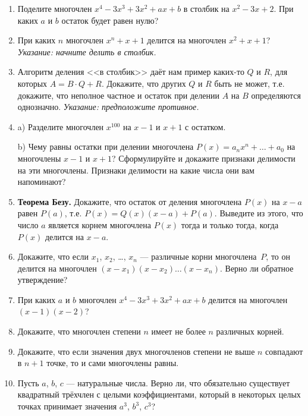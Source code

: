 \documentclass{article}
\begin{document}
\begin{enumerate}[label*=\protect\fbox{\arabic{enumi}}]

\item Поделите многочлен $x^4-3x^3+3x^2+ax+b$ в столбик на $x^2-3x+2$. При каких $a$
и $b$ остаток будет равен нулю? 

\item При каких $n$ многочлен $x^n+x+1$ делится на многочлен $x^2+x+1$? {\it Указание: начните 
делить в столбик.}

\item Алгоритм деления <<в столбик>> даёт нам пример каких-то $Q$ и $R$, для которых
$A=B\cdot Q+R$. Докажите, что других $Q$ и $R$ быть не может, т.е. докажите, что 
неполное частное и остаток при делении $A$ на $B$ определяются однозначно. {\it Указание: 
предположите противное.} 

\item  a) Разделите многочлен $x^{100}$ на $x-1$ и $x+1$ с остатком. 

b) Чему равны остатки при делении многочлена $P(x)=a_nx^n+\ldots+a_0$
на многочлены $x-1$ и $x+1$? Сформулируйте и докажите признаки делимости на эти многочлены.
Признаки делимости на какие числа они вам напоминают?

\item \textbf {Теорема Безу.} Докажите, что остаток от деления многочлена $P(x)$ на $x-a$ равен $P(a)$,
т.е. $P(x)=Q(x)(x-a)+P(a)$. Выведите из этого, что число $a$ является корнем многочлена $P(x)$
тогда и только тогда, когда $P(x)$ делится на $x-a$.

\item Докажите, что если $x_1$, $x_2$, \ldots, $x_n$ --- различные корни многочлена~$P$,
то он делится на многочлен $(x-x_1)(x-x_2)\ldots (x-x_n)$. Верно ли обратное утверждение? 

\item При каких $a$ и $b$ многочлен $x^4-3x^3+3x^2+ax+b$  делится на многочлен $(x-1)(x-2)$?

\item Докажите, что многочлен степени $n$ имеет не более $n$ различных корней. 

\item Докажите, что если значения двух многочленов степени не выше $n$ совпадают в $n+1$ точке, то и сами многочлены равны. 

\item Пусть $a$, $b$, $c$ --- натуральные числа. Верно ли, что обязательно существует квадратный трёхчлен с целыми коэффициентами, который в некоторых целых точках принимает значения $a^3$, $b^3$, $c^3$?



\end{enumerate}
\end{document}
